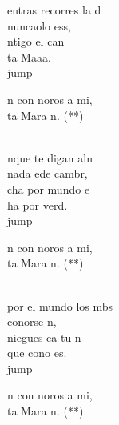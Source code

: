 \begin{cancion}%
	entras recorres la d\\
	 nuncaolo ess, \\
	ntigo  el can\\
	ta Maaa.\\jump\\
	\begin{chorus}%
	n con noros a mi,\\
	ta Mara n. (**)\\
	\end{chorus}%
	\jump\\
	nque te digan aln\\
	 nada ede cambr,\\
	cha por mundo e\\
	ha por verd.\\jump\\
	\begin{chorus}%
	n con noros a mi,\\
	ta Mara n. (**)\\
	\end{chorus}%
	\jump\\
	 por el mundo los mbs\\
	 conorse n,\\
	 niegues ca tu n\\
	que cono es. \\jump\\
	\begin{chorus}%
	n con noros a mi,\\
	ta Mara n. (**)\\

\end{chorus}
\end{cancion}
